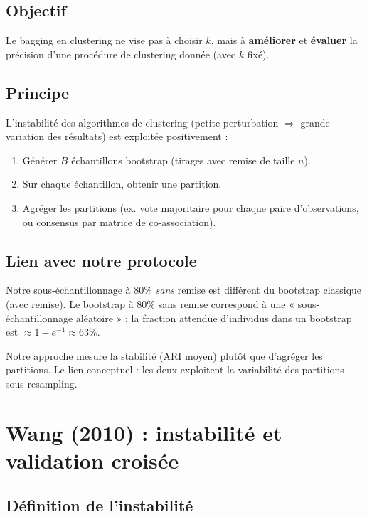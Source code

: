 \documentclass[11pt, a4paper]{article}
\begin{document}
\subsection{Objectif}

Le bagging en clustering ne vise pas à choisir $k$, mais à \textbf{améliorer} et \textbf{évaluer} la précision d'une procédure de clustering donnée (avec $k$ fixé).

\subsection{Principe}

L'instabilité des algorithmes de clustering (petite perturbation $\Rightarrow$ grande variation des résultats) est exploitée positivement :
\begin{enumerate}
  \item Générer $B$ échantillons bootstrap (tirages avec remise de taille $n$).
  \item Sur chaque échantillon, obtenir une partition.
  \item Agréger les partitions (ex. vote majoritaire pour chaque paire d'observations, ou consensus par matrice de co-association).
\end{enumerate}

\subsection{Lien avec notre protocole}

Notre sous-échantillonnage à 80\% \emph{sans} remise est différent du bootstrap classique (avec remise). Le bootstrap à 80\% sans remise correspond à une « sous-échantillonnage aléatoire » ; la fraction attendue d'individus dans un bootstrap est $\approx 1 - e^{-1} \approx 63\%$.

Notre approche mesure la stabilité (ARI moyen) plutôt que d'agréger les partitions. Le lien conceptuel : les deux exploitent la variabilité des partitions sous resampling.

\section{Wang (2010) : instabilité et validation croisée}

\subsection{Définition de l'instabilité}
\end{document}
